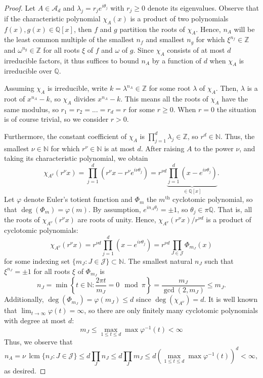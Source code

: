 \documentclass[10pt,a4paper]{amsart}
\def\N{\mathbb{N}}
\def\Q{\mathbb{Q}}
\newcommand{\Set}[1]{\left\{ #1 \right\}}
\def\Z{\mathbb{Z}}
\newcommand{\brac}[1]{\left({#1}\right)}
\def\lcm{\operatorname{lcm}}
\def\mJ{\mathcal{J}}
\newcommand{\set}[1]{\{ #1 \}}
\begin{document}
\begin{proof}
    Let $A\in \mathcal{A}_d$ and $\lambda_j = r_je^{i\theta_j}$ with $r_j \ge 0$ denote its eigenvalues. Observe that if the characteristic polynomial $\chi_A(x)$ is a product of two polynomials $f(x), g(x) \in \Q[x]$, then $f$ and $g$ partition the roots of $\chi_A$. Hence, $n_A$ will be the least common multiple of the smallest $n_f$ and smallest $n_g$ for which $\xi^{n_f} \in \Z$ and $\omega^{n_g} \in \Z$ for all roots $\xi$ of $f$ and $\omega$ of $g$. Since $\chi_A$ consists of at most $d$ irreducible factors, it thus suffices to bound $n_A$ by a function of $d$ when $\chi_A$ is irreducible over $\Q$.
    
    Assuming $\chi_A$ is irreducible, write $k = \lambda^{n_A} \in \Z$ for some root $\lambda$ of $\chi_A$. Then, $\lambda$ is a root of $x^{n_A} - k$, so $\chi_A$ divides $x^{n_A} - k$. This means all the roots of $\chi_A$ have the same modulus, so $r_1=r_2=...=r_d=r$ for some $r\geq0$. When $r=0$ the situation is of course trivial, so we consider $r>0$. 
    
    
    Furthermore, the constant coefficient of $\chi_A$ is $\prod_{j=1}^d \lambda_j\in \Z$, so $r^d \in \N$. Thus, the smallest $\nu \in \N$ for which $r^\nu \in \N$ is at most $d$. After raising $A$ to the power $\nu$, and taking its characteristic polynomial, we obtain 
    $$
        \chi_{A^\nu}( r^\nu x) = \prod_{j=1}^d \brac{r^\nu x - r^\nu e^{i \nu\theta_j}}= r^{\nu d} \underbrace{\prod_{j=1}^d \brac{x - e^{i \nu\theta_j}}}_{\in \Q[x]}.
    $$
    Let $\varphi$ denote Euler's totient function and $\Phi_m$ the $m^{\text{th}}$ cyclotomic polynomial, so that $\deg(\Phi_m) = \varphi(m)$. By assumption, $e^{in_A\theta_j} = \pm 1$, so $\theta_j \in \pi \Q$. That is, all the roots of $\chi_{A^\nu}( r^\nu x)$ are roots of unity. Hence, $\chi_{A^\nu}( r^\nu x)/r^{\nu d}$ is a product of cyclotomic polynomials:
    $$
        \chi_{A^\nu}( r^\nu x) = r^{\nu d} \prod_{j=1}^d \brac{x - e^{i \nu\theta_j}} = r^{\nu d} \prod_{J \in \mJ} \Phi_{m_J}(x)
    $$
    for some indexing set $\set{m_J: J \in \mJ} \subset \N$. The smallest natural $n_J$ such that $\xi^{n_J} =\pm 1$ for all roots $\xi$ of $\Phi_{m_J}$ is
    $$
        n_J = \min \Set{t \in \N: \frac{2\pi t}{m_J} = 0 \mod \pi} = \frac{m_J}{\gcd(2,m_J)} \le m_J.
    $$
    Additionally, $\deg(\Phi_{m_J}) = \varphi(m_J) \le d$ since $\deg(\chi_{A^\nu}) = d$. It is well known that $\lim_{t \to \infty} \varphi(t) = \infty$, so there are only finitely many cyclotomic polynomials with degree at most $d$:
    $$
         m_J \le \max_{1 \le t \le d} \max \varphi^{-1}(t) < \infty
    $$
    Thus, we observe that
    $$
        n_A = \nu \, \lcm\set{n_J : J \in \mJ} \le d \prod_{J} n_J \le d \prod_{J} m_J \le d \brac{\max_{1 \le t \le d} \max \varphi^{-1}(t)}^d < \infty,
    $$
    as desired.
\end{proof}
\end{document}

